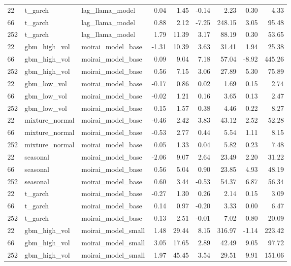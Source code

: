 {\begin{tabular}{lllrrrrrr}
22 & t\_garch & lag\_llama\_model & 0.04 & 1.45 & -0.14 & 2.23 & 0.30 & 4.33 \\
66 & t\_garch & lag\_llama\_model & 0.88 & 2.12 & -7.25 & 248.15 & 3.05 & 95.48 \\
252 & t\_garch & lag\_llama\_model & 1.79 & 11.39 & 3.17 & 88.19 & 0.30 & 53.65 \\
\midrule
22 & gbm\_high\_vol & moirai\_model\_base & -1.31 & 10.39 & 3.63 & 31.41 & 1.94 & 25.38 \\
66 & gbm\_high\_vol & moirai\_model\_base & 0.09 & 9.04 & 7.18 & 57.04 & -8.92 & 445.26 \\
252 & gbm\_high\_vol & moirai\_model\_base & 0.56 & 7.15 & 3.06 & 27.89 & 5.30 & 75.89 \\
\midrule
22 & gbm\_low\_vol & moirai\_model\_base & -0.17 & 0.86 & 0.02 & 1.69 & 0.15 & 2.74 \\
66 & gbm\_low\_vol & moirai\_model\_base & -0.02 & 1.21 & 0.16 & 3.65 & 0.13 & 2.47 \\
252 & gbm\_low\_vol & moirai\_model\_base & 0.15 & 1.57 & 0.38 & 4.46 & 0.22 & 8.27 \\
\midrule
22 & mixture\_normal & moirai\_model\_base & -0.46 & 2.42 & 3.83 & 43.12 & 2.52 & 52.28 \\
66 & mixture\_normal & moirai\_model\_base & -0.53 & 2.77 & 0.44 & 5.54 & 1.11 & 8.15 \\
252 & mixture\_normal & moirai\_model\_base & 0.05 & 1.33 & 0.04 & 5.82 & 0.23 & 7.48 \\
\midrule
22 & seasonal & moirai\_model\_base & -2.06 & 9.07 & 2.64 & 23.49 & 2.20 & 31.22 \\
66 & seasonal & moirai\_model\_base & 0.56 & 5.04 & 0.90 & 23.85 & 4.93 & 48.19 \\
252 & seasonal & moirai\_model\_base & 0.60 & 3.44 & -0.53 & 54.37 & 6.87 & 56.34 \\
\midrule
22 & t\_garch & moirai\_model\_base & -0.27 & 1.30 & 0.26 & 2.14 & 0.15 & 3.09 \\
66 & t\_garch & moirai\_model\_base & 0.14 & 0.97 & -0.20 & 3.33 & 0.00 & 6.47 \\
252 & t\_garch & moirai\_model\_base & 0.13 & 2.51 & -0.01 & 7.02 & 0.80 & 20.09 \\
\midrule
22 & gbm\_high\_vol & moirai\_model\_small & 1.48 & 29.44 & 8.15 & 316.97 & -1.14 & 223.42 \\
66 & gbm\_high\_vol & moirai\_model\_small & 3.05 & 17.65 & 2.89 & 42.49 & 9.05 & 97.72 \\
252 & gbm\_high\_vol & moirai\_model\_small & 1.97 & 45.45 & 3.54 & 29.51 & 9.91 & 151.06 \\

\end{tabular}}
